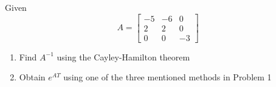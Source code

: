 \item Given
  \begin{equation}
    A = \begin{bmatrix}
-5 & -6 & 0\\
2 & 2 & 0\\
0 & 0 & -3
\end{bmatrix}
\end{equation}
  \begin{enumerate}
  \item Find $A^{-1}$ using the Cayley-Hamilton theorem
  \item Obtain $e^{AT}$ using one of the three mentioned methods in Problem 1
  \end{enumerate}